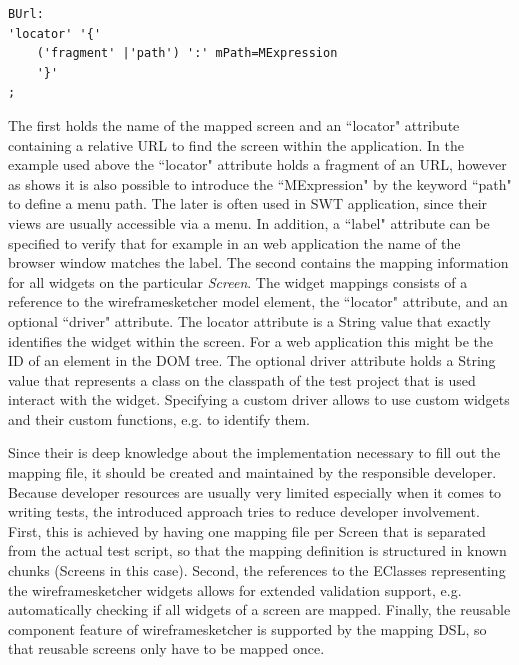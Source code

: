 \documentclass{sig-alternate-05-2015}
\begin{document}
\begin{lstlisting}[captionpos=b, caption=Mapping Grammar, label={lst:mappingGrammar}, language=xtext]
BUrl:
'locator' '{'
	('fragment' |'path') ':' mPath=MExpression
	'}'
;
\end{lstlisting}

The first holds the name of the mapped screen and an ``locator" attribute containing a relative URL to find the screen within the application.
In the example used above the ``locator" attribute holds a fragment of an URL, however as  shows it is also possible to introduce the ``MExpression" by the keyword ``path" to define a menu path.
The later is often used in SWT application, since their views are usually accessible via a menu.  
In addition, a ``label" attribute can be specified to verify that for example in an web application the name of the browser window matches the label.
The second contains the mapping information for all widgets on the particular \textit{Screen}.
The widget mappings consists of a reference to the wireframesketcher model element, the ``locator" attribute, and an optional ``driver" attribute.
The locator attribute is a String value that exactly identifies the widget within the screen.
For a web application this might be the ID of an element in the DOM tree.
The optional driver attribute holds a String value that represents a class on the classpath of the test project that is used interact with the widget.
Specifying a custom driver allows to use custom widgets and their custom functions, e.g. to identify them.

Since their is deep knowledge about the implementation necessary to fill out the mapping file, it should be created and maintained by the responsible developer. 
Because developer resources are usually very limited especially when it comes to writing tests, the introduced approach tries to reduce developer involvement.
First, this is achieved by having one mapping file per Screen that is separated from the actual test script, so that the mapping definition is structured in known chunks (Screens in this case). 
Second, the references to the EClasses representing the wireframesketcher widgets allows for extended validation support, e.g. automatically checking if all widgets of a screen are mapped.
Finally, the reusable component feature of wireframesketcher is supported by the mapping DSL, so that reusable screens only have to be mapped once.
\end{document}
